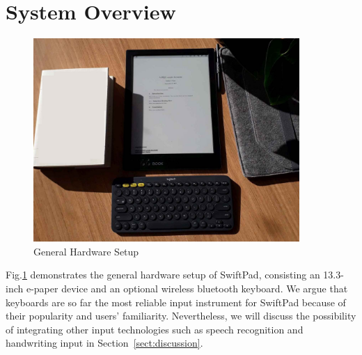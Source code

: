 \documentclass[]{sigchi}
\begin{document}





\section{System Overview} \label{sect:arch}
\begin{figure}
\begin{center}
\includegraphics[width=0.9\textwidth]{figures/keyboard1}
\caption{General Hardware Setup}
\label{fig:setup}
\end{center}
\end{figure}
	

Fig.\ref{fig:setup} demonstrates the general hardware setup of SwiftPad, consisting an 13.3-inch e-paper device and an optional wireless bluetooth keyboard. We argue that keyboards are so far the most reliable input instrument for SwiftPad because of their popularity and users' familiarity. Nevertheless, we will discuss the possibility of integrating other input technologies such as speech recognition and handwriting input in Section~\ref{sect:discussion}. 
\end{document}
